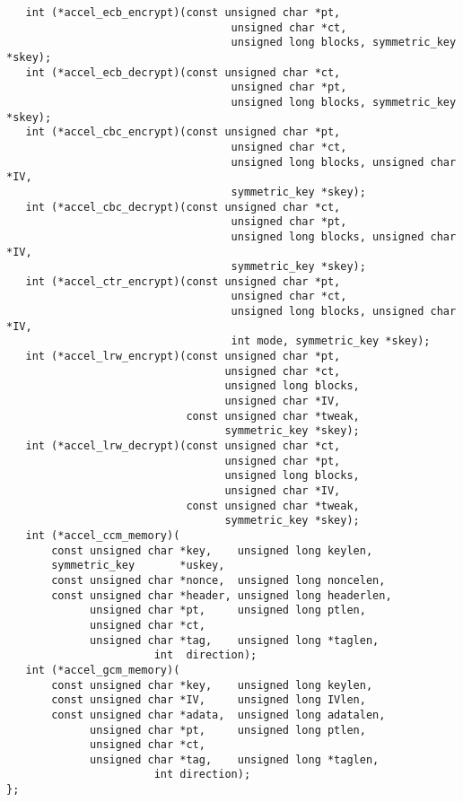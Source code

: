 \documentclass[a4paper]{book}
\begin{document}
\begin{small}
\begin{verbatim}
   int (*accel_ecb_encrypt)(const unsigned char *pt, 
                                   unsigned char *ct, 
                                   unsigned long blocks, symmetric_key *skey);
   int (*accel_ecb_decrypt)(const unsigned char *ct, 
                                   unsigned char *pt, 
                                   unsigned long blocks, symmetric_key *skey);
   int (*accel_cbc_encrypt)(const unsigned char *pt, 
                                   unsigned char *ct, 
                                   unsigned long blocks, unsigned char *IV, 
                                   symmetric_key *skey);
   int (*accel_cbc_decrypt)(const unsigned char *ct, 
                                   unsigned char *pt, 
                                   unsigned long blocks, unsigned char *IV, 
                                   symmetric_key *skey);
   int (*accel_ctr_encrypt)(const unsigned char *pt, 
                                   unsigned char *ct, 
                                   unsigned long blocks, unsigned char *IV, 
                                   int mode, symmetric_key *skey);
   int (*accel_lrw_encrypt)(const unsigned char *pt, 
                                  unsigned char *ct, 
                                  unsigned long blocks, 
                                  unsigned char *IV, 
                            const unsigned char *tweak, 
                                  symmetric_key *skey);
   int (*accel_lrw_decrypt)(const unsigned char *ct, 
                                  unsigned char *pt, 
                                  unsigned long blocks, 
                                  unsigned char *IV, 
                            const unsigned char *tweak, 
                                  symmetric_key *skey);
   int (*accel_ccm_memory)(
       const unsigned char *key,    unsigned long keylen,
       symmetric_key       *uskey,
       const unsigned char *nonce,  unsigned long noncelen,
       const unsigned char *header, unsigned long headerlen,
             unsigned char *pt,     unsigned long ptlen,
             unsigned char *ct,
             unsigned char *tag,    unsigned long *taglen,
                       int  direction);
   int (*accel_gcm_memory)(
       const unsigned char *key,    unsigned long keylen,
       const unsigned char *IV,     unsigned long IVlen,
       const unsigned char *adata,  unsigned long adatalen,
             unsigned char *pt,     unsigned long ptlen,
             unsigned char *ct,
             unsigned char *tag,    unsigned long *taglen,
                       int direction);
};
\end{verbatim}
\end{small}
\end{document}
